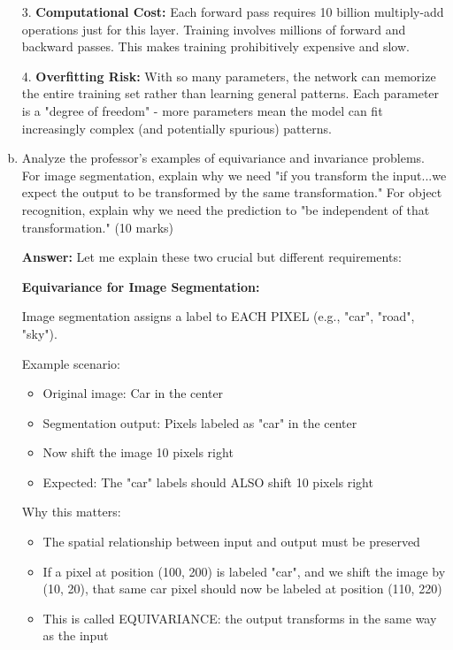\documentclass[12pt]{article}
\newcommand{\answer}[1]{{\color{answercolor}\textbf{Answer:} #1}}
\newcommand{\explanation}[1]{{\color{explanationcolor}#1}}
\begin{document}
\begin{enumerate}[(a)]
{    3. \textbf{Computational Cost:}
    \explanation{
    Each forward pass requires 10 billion multiply-add operations just for this layer.
    Training involves millions of forward and backward passes.
    This makes training prohibitively expensive and slow.
    }
    
    4. \textbf{Overfitting Risk:}
    \explanation{
    With so many parameters, the network can memorize the entire training set rather than learning general patterns.
    Each parameter is a "degree of freedom" - more parameters mean the model can fit increasingly complex (and potentially spurious) patterns.
    }
    }
    
    \item Analyze the professor's examples of equivariance and invariance problems. For image segmentation, explain why we need "if you transform the input...we expect the output to be transformed by the same transformation." For object recognition, explain why we need the prediction to "be independent of that transformation." \hfill (10 marks)
    
    \answer{
    Let me explain these two crucial but different requirements:
    
    \textbf{Equivariance for Image Segmentation:}
    
    \explanation{
    Image segmentation assigns a label to EACH PIXEL (e.g., "car", "road", "sky").
    
    Example scenario:
    \begin{itemize}
        \item Original image: Car in the center
        \item Segmentation output: Pixels labeled as "car" in the center
        \item Now shift the image 10 pixels right
        \item Expected: The "car" labels should ALSO shift 10 pixels right
    \end{itemize}
    
    Why this matters:
    \begin{itemize}
        \item The spatial relationship between input and output must be preserved
        \item If a pixel at position (100, 200) is labeled "car", and we shift the image by (10, 20), that same car pixel should now be labeled at position (110, 220)
        \item This is called EQUIVARIANCE: the output transforms in the same way as the input
    \end{itemize}
    
}}
\end{enumerate}
\end{document}

